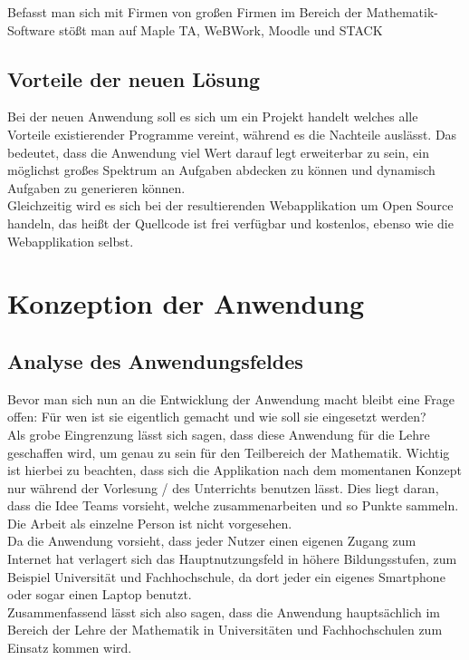 Befasst man sich mit Firmen von großen Firmen im Bereich der Mathematik-Software stößt man auf Maple TA, WeBWork, Moodle und STACK


\section{Vorteile der neuen Lösung}

Bei der neuen Anwendung soll es sich um ein Projekt handelt welches alle Vorteile existierender Programme vereint, während es die Nachteile auslässt. Das bedeutet, dass die Anwendung viel Wert darauf legt erweiterbar zu sein, ein möglichst großes Spektrum an Aufgaben abdecken zu können und dynamisch Aufgaben zu generieren können. \\
Gleichzeitig wird es sich bei der resultierenden Webapplikation um Open Source handeln, das heißt der Quellcode ist frei verfügbar und kostenlos, ebenso wie die Webapplikation selbst.

\chapter{Konzeption der Anwendung}

\section{Analyse des Anwendungsfeldes}

Bevor man sich nun an die Entwicklung der Anwendung macht bleibt eine Frage offen: Für wen ist sie eigentlich gemacht und wie soll sie eingesetzt werden? \\
Als grobe Eingrenzung lässt sich sagen, dass diese Anwendung für die Lehre geschaffen wird, um genau zu sein für den Teilbereich der Mathematik. Wichtig ist hierbei zu beachten, dass sich die Applikation nach dem momentanen Konzept nur während der Vorlesung / des Unterrichts benutzen lässt. Dies liegt daran, dass die Idee Teams vorsieht, welche zusammenarbeiten und so Punkte sammeln. Die Arbeit als einzelne Person ist nicht vorgesehen. \\
Da die Anwendung vorsieht, dass jeder Nutzer einen eigenen Zugang zum Internet hat verlagert sich das Hauptnutzungsfeld in höhere Bildungsstufen, zum Beispiel Universität und Fachhochschule, da dort jeder ein eigenes Smartphone oder sogar einen Laptop benutzt. \\
Zusammenfassend lässt sich also sagen, dass die Anwendung hauptsächlich im Bereich der Lehre der Mathematik in Universitäten und Fachhochschulen zum Einsatz kommen wird.

